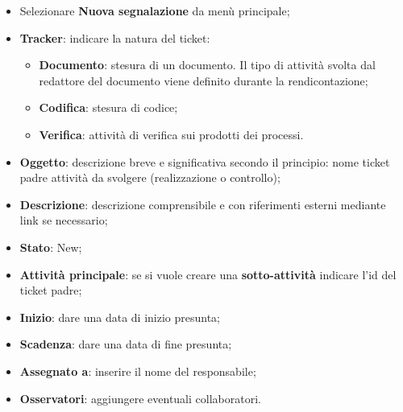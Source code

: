 \label{sec:realizzazioneControllo}
		\begin{itemize}
		
		\item Selezionare \textbf{Nuova segnalazione} da menù principale; 
		\item \textbf{Tracker}: indicare la natura del ticket: 
		\begin{itemize}
	\item \textbf{Documento}: stesura di un documento. Il tipo di attività svolta dal redattore del documento viene definito durante la rendicontazione; 
	\item \textbf{Codifica}: stesura di codice; 
	\item \textbf{Verifica}: attività di verifica sui prodotti dei processi. 

	\end{itemize}

\item \textbf{Oggetto}: descrizione breve e significativa secondo il principio: nome ticket padre attività da svolgere (realizzazione o controllo); 
\item \textbf{Descrizione}: descrizione comprensibile e con riferimenti esterni mediante link se 
necessario; 

\item \textbf{Stato}: New; 
\item \textbf{Attività principale}: se si vuole creare una \textbf{sotto-attività} indicare l’id del ticket 
padre; 
\item \textbf{Inizio}: dare una data di inizio presunta; 
\item \textbf{Scadenza}: dare una data di fine presunta; 
\item \textbf{Assegnato a}: inserire il nome del responsabile; 
\item \textbf{Osservatori}: aggiungere eventuali collaboratori. 
\end{itemize} 

\label{sec:TicketVerifica}

